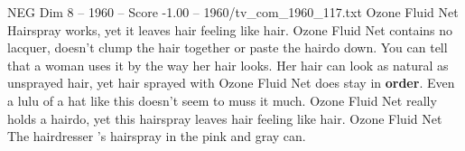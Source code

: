 \begin{textsample}{NEG Dim 8 – 1960 – Score -1.00 – 1960/tv\_com\_1960\_117.txt}  \label{ex:f8_neg_034}
Ozone Fluid Net Hairspray works, yet it leaves hair feeling like hair.
Ozone Fluid Net contains no lacquer, doesn't clump the hair together or paste the hairdo down.
You can tell that a woman uses it by the way her hair looks.
Her hair can look as natural as unsprayed hair, yet hair sprayed with Ozone Fluid Net does stay in \textbf{order}.
Even a lulu of a hat like this doesn't seem to muss it much.
Ozone Fluid Net really holds a hairdo, yet this hairspray leaves hair feeling like hair.
Ozone Fluid Net The hairdresser 's hairspray in the pink and gray can.

\end{textsample}
